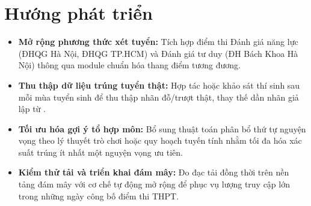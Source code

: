 \section{Hướng phát triển}

\begin{itemize}[leftmargin=1.6em, itemsep=2pt]
  \item \textbf{Mở rộng phương thức xét tuyển:} Tích hợp điểm thi Đánh giá năng lực (ĐHQG Hà Nội, ĐHQG TP.HCM) và Đánh giá tư duy (ĐH Bách Khoa Hà Nội) thông qua module chuẩn hóa thang điểm tương đương.
  \item \textbf{Thu thập dữ liệu trúng tuyển thật:} Hợp tác hoặc khảo sát thí sinh sau mỗi mùa tuyển sinh để thu thập nhãn đỗ/trượt thật, thay thế dần nhãn giả lập từ .
  \item \textbf{Tối ưu hóa gợi ý tổ hợp môn:} Bổ sung thuật toán phân bổ thứ tự nguyện vọng theo lý thuyết trò chơi hoặc quy hoạch tuyến tính nhằm tối đa hóa xác suất trúng ít nhất một nguyện vọng ưu tiên.
  \item \textbf{Kiểm thử tải và triển khai đám mây:} Đo đạc tải đồng thời trên nền tảng đám mây với cơ chế tự động mở rộng để phục vụ lượng truy cập lớn trong những ngày công bố điểm thi THPT.
\end{itemize}
